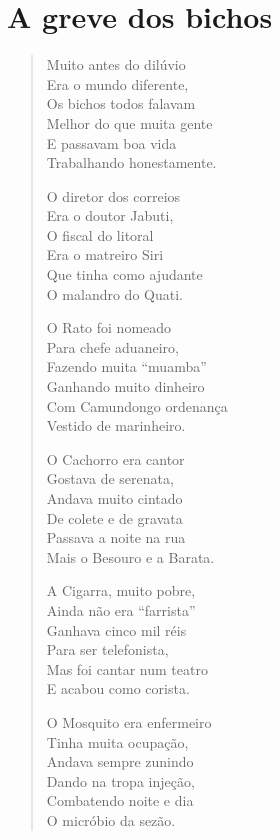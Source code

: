 \chapter{A greve dos bichos}

\begin{verse}
Muito antes do dilúvio\\
Era o mundo diferente,\\
Os bichos todos falavam\\
Melhor do que muita gente\\
E passavam boa vida\\
Trabalhando honestamente.

O diretor dos correios\\
Era o doutor Jabuti,\\
O fiscal do litoral\\
Era o matreiro Siri\\
Que tinha como ajudante\\
O malandro do Quati.

O Rato foi nomeado\\
Para chefe aduaneiro,\\
Fazendo muita “muamba”\\
Ganhando muito dinheiro\\
Com Camundongo ordenança\\
Vestido de marinheiro.

O Cachorro era cantor\\
Gostava de serenata,\\
Andava muito cintado\\
De colete e de gravata\\
Passava a noite na rua\\
Mais o Besouro e a Barata.

A Cigarra, muito pobre,\\
Ainda não era “farrista”\\
Ganhava cinco mil réis\\
Para ser telefonista, \\
Mas foi cantar num teatro\\
E acabou como corista.

O Mosquito era enfermeiro\\
Tinha muita ocupação,\\
Andava sempre zunindo\\
Dando na tropa injeção,\\
Combatendo noite e dia\\
O micróbio da sezão.


\end{verse}
